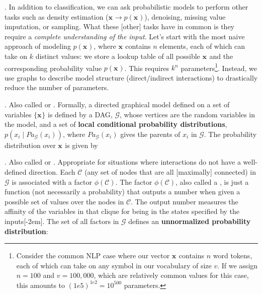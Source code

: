 \documentclass[11pt]{article}
\renewcommand\vec[2][]{\bm{#2}_{#1}}
\newcommand\myspace[1][]{\vspace{#1\bigskipamount}}
\newcommand\p{\Needspace{10\baselineskip} \noindent}
\begin{document}
\p {}. In addition to classification, we can ask probabilistic models to perform other tasks such as density estimation ($\vec{x} \rightarrow p(\vec{x})$), denoising, missing value imputation, or sampling. What these [other] tasks have in common is they require a \textit{complete understanding of the input}. Let's start with the most naive approach of modeling $p(\vec{x})$, where $\vec{x}$ contains $n$ elements, each of which can take on $k$ distinct values: we store a lookup table of all possible $\vec{x}$ and the corresponding probability value $p(\vec{x})$. This requires $k^n$ parameters\footnote{Consider the common NLP case where our vector $\vec{x}$ contains $n$ word tokens, each of which can take on any symbol in our vocabulary of size $v$. If we assign $n=100$ and $v=100,000$, which are relatively common values for this case, this amounts to $(1e5)^{1e2} = 10^{500}$ parameters.}. Instead, we use graphs to describe model structure (direct/indirect interactions) to drastically reduce the number of parameters.

\myspace
\p {}. Also called  or . Formally, a directed graphical model defined on a set of variables $\{\vec{x}\}$ is defined by a DAG, $\mathcal{G}$, whose vertices are the random variables in the model, and a set of \textbf{local conditional probability distributions}, $p(x_i \mid Pa_{\mathcal{G}}(x_i))$, where $Pa_{\mathcal{G}}(x_i)$ gives the parents of $x_i$ in $\mathcal{G}$. The probability distribution over $\vec{x}$ is given by
\graybox{
	p(\vec{x}) = \prod_i p(x_i \mid Pa_{\mathcal{G}}(x_i))
	}
	
\myspace
\p {}. Also called  or . Appropriate for situations where interactions do not have a well-defined direction. Each  $\mathcal{C}$ (any set of nodes that are all [maximally] connected) in $\mathcal{G}$ is associated with a factor $\phi(\mathcal{C})$. The factor $\phi(\mathcal{C})$, also called a , is just a function (not necessarily a probability) that outputs a number when given a possible set of values over the nodes in $\mathcal{C}$. The output number measures the affinity of the variables in that clique for being in the states specified by the inputs[-2em]. The set of all factors in $\mathcal{G}$ defines an \textbf{unnormalized probability distribution}:
\graybox{
	\widetilde{p}(\vec{x}) = \prod_{\mathcal{C} \in \mathcal{G}} \phi(\mathcal{C})
	}
\end{document}
